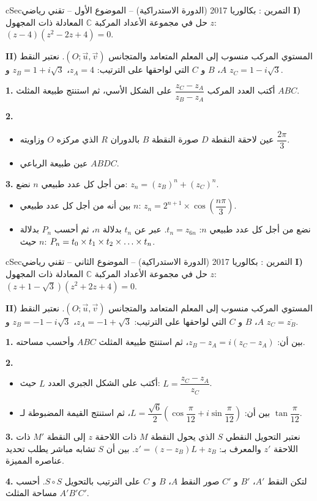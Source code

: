 \documentclass[12pt,a4paper]{article}
\newenvironment{BOX}[2]{\begin{otherlanguage}{english}\begin{arbox}{#1}{#2}}{\end{arbox}\end{otherlanguage}}
\newcounter{exo}
\newenvironment{tamrin}[1]{\stepcounter{exo}\begin{BOX}{cSec}{التمرين \theexo: #1}}{\end{BOX}}
\renewcommand{\dots}{\mathinner{\ldotp\ldotp\ldotp}}
\newenvironment{sq}{\begin{itemize}[leftmargin=2.4em,itemsep=3pt]}{\end{itemize}}
\newcommand{\qa}{\item[(أ)]}\newcommand{\qb}{\item[(ب)]}\newcommand{\qc}{\item[(جـ)]}\newcommand{\qd}{\item[(د)]}\newcommand{\qe}{\item[(هـ)]}
\newcommand{\QQ}[1]{\par\smallskip\textbf{#1.} }
\begin{document}
\begin{tamrin}{بكالوريا 2017 (الدورة الاستدراكية) -- الموضوع الأول -- تقني رياضي}
\textbf{I)} حل في مجموعة الأعداد المركبة $\mathbb{C}$ المعادلة ذات المجهول $z$: $(z-4)(z^2-2z+4)=0$.

\textbf{II)} المستوي المركب منسوب إلى المعلم المتعامد والمتجانس $(O;\vec u,\vec v)$. نعتبر النقط $A$، $B$ و $C$ التي لواحقها على الترتيب: $z_A=4$، $z_B=1+i\sqrt3$ و $z_C=1-i\sqrt3$.

\QQ{1} أكتب العدد المركب $\dfrac{z_C-z_A}{z_B-z_A}$ على الشكل الأسي، ثم استنتج طبيعة المثلث $ABC$.

\QQ{2}
\begin{sq}
\qa عين لاحقة النقطة $D$ صورة النقطة $B$ بالدوران $R$ الذي مركزه $O$ وزاويته $\dfrac{2\pi}{3}$.
\qb عين طبيعة الرباعي $ABDC$.
\end{sq}
\QQ{3} من أجل كل عدد طبيعي $n$ نضع: $z_n=(z_B)^n+(z_C)^n$.
\begin{sq}
\qa بين أنه من أجل كل عدد طبيعي $n$: $z_n=2^{n+1}\times\cos\left(\dfrac{n\pi}{3}\right)$.
\qb نضع من أجل كل عدد طبيعي $n$: $t_n=z_{6n}$. عبر عن $t_n$ بدلالة $n$، ثم أحسب $P_n$ بدلالة $n$ حيث: $P_n=t_0\times t_1\times t_2\times\dots\times t_n$.
\end{sq}
\end{tamrin}

\begin{tamrin}{بكالوريا 2017 (الدورة الاستدراكية) -- الموضوع الثاني -- تقني رياضي}
\textbf{I)} حل في مجموعة الأعداد المركبة $\mathbb{C}$ المعادلة ذات المجهول $z$: $(z+1-\sqrt3)(z^2+2z+4)=0$.

\textbf{II)} المستوي المركب منسوب إلى المعلم المتعامد والمتجانس $(O;\vec u,\vec v)$. نعتبر النقط $A$، $B$ و $C$ التي لواحقها على الترتيب: $z_A=-1+\sqrt3$، $z_B=-1-i\sqrt3$ و $z_C=\overline{z_B}$.

\QQ{1} بين أن: $z_B-z_A=i(z_C-z_A)$، ثم استنتج طبيعة المثلث $ABC$ وأحسب مساحته.

\QQ{2}
\begin{sq}
\qa أكتب على الشكل الجبري العدد $L$ حيث: $L=\dfrac{z_C-z_A}{z_C}$.
\qb بين أن: $L=\dfrac{\sqrt6}{2}\left(\cos\dfrac{\pi}{12}+i\sin\dfrac{\pi}{12}\right)$، ثم استنتج القيمة المضبوطة لـ $\tan\dfrac{\pi}{12}$.
\end{sq}
\QQ{3} نعتبر التحويل النقطي $S$ الذي يحول النقطة $M$ ذات اللاحقة $z$ إلى النقطة $M'$ ذات اللاحقة $z'$ والمعرف بـ: $z'=(z-z_B)L+z_B$.
بين أن $S$ تشابه مباشر يطلب تحديد عناصره المميزة.

\QQ{4} لتكن النقط $A'$، $B'$ و $C'$ صور النقط $A$، $B$ و $C$ على الترتيب بالتحويل $S\circ S$. أحسب مساحة المثلث $A'B'C'$.
\end{tamrin}
\end{document}
